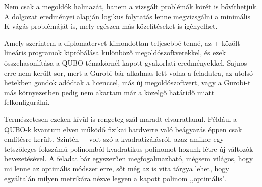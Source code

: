 Nem csak a megoldók halmazát, hanem a vizsgált problémák körét is bővíthetjük. A dolgozat eredményei alapján logikus folytatás lenne megvizsgálni a minimális K-vágás problémáját is, mely egészen más közelítéseket is igényelhet.

Amely szerintem a diplomatervet kimondottan teljesebbé tenné, az \az+ közölt lineáris programok kipróbálása különböző megoldószoftverekkel, és ezek összehasonlítása a QUBO témakörnél kapott gyakorlati eredményekkel. Sajnos erre nem került sor, mert a Gurobi bár alkalmas lett volna a feladatra, az utolsó hetekben gondok adódtak a licenccel, más új  megoldószoftvert, vagy a Gurobi-t más környezetben pedig nem akartam már a közelgő határidő miatt felkonfigurálni.

Természetesen ezeken kívül is rengeteg szál maradt elvarratlanul. Például a QUBO-k kvantum elven működő fizikai hardverre való beágyazás éppen csak említésre került. Szintén \az+ volt szó a kvadratizálásról, azaz amikor egy tetszőleges fokszámú polinomból kvadratikus polinomot hozunk létre új változók bevezetésével. A feladat bár egyszerűen megfogalmazható, mégsem világos, hogy mi lenne az optimális módszer erre, sőt még az is vita tárgya lehet, hogy egyáltalán milyen metrikára nézve legyen a kapott polinom ,,optimális".